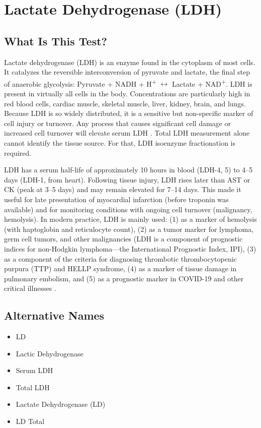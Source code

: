 \chapter{Lactate Dehydrogenase (LDH)}

\section*{What Is This Test?}
Lactate dehydrogenase (LDH) is an enzyme found in the cytoplasm of most cells. It catalyzes the reversible interconversion of pyruvate and lactate, the final step of anaerobic glycolysis: Pyruvate + NADH + H\textsuperscript{+} $\leftrightarrow$ Lactate + NAD\textsuperscript{+}. LDH is present in virtually all cells in the body. Concentrations are particularly high in red blood cells, cardiac muscle, skeletal muscle, liver, kidney, brain, and lungs. Because LDH is so widely distributed, it is a sensitive but non-specific marker of cell injury or turnover. Any process that causes significant cell damage or increased cell turnover will elevate serum LDH \cite{huijgen1997clinical}. Total LDH measurement alone cannot identify the tissue source. For that, LDH isoenzyme fractionation is required.

LDH has a serum half-life of approximately 10 hours in blood (LDH-4, 5) to 4--5 days (LDH-1, from heart). Following tissue injury, LDH rises later than AST or CK (peak at 3--5 days) and may remain elevated for 7--14 days. This made it useful for late presentation of myocardial infarction (before troponin was available) and for monitoring conditions with ongoing cell turnover (malignancy, hemolysis). In modern practice, LDH is mainly used: (1) as a marker of hemolysis (with haptoglobin and reticulocyte count), (2) as a tumor marker for lymphoma, germ cell tumors, and other malignancies (LDH is a component of prognostic indices for non-Hodgkin lymphoma---the International Prognostic Index, IPI), (3) as a component of the criteria for diagnosing thrombotic thrombocytopenic purpura (TTP) and HELLP syndrome, (4) as a marker of tissue damage in pulmonary embolism, and (5) as a prognostic marker in COVID-19 and other critical illnesses \cite{tierney2023current,tietz2023textbook}.

\section*{Alternative Names}
\begin{itemize}
  \item LD
  \item Lactic Dehydrogenase
  \item Serum LDH
  \item Total LDH
  \item Lactate Dehydrogenase (LD)
  \item LD Total
\end{itemize}
